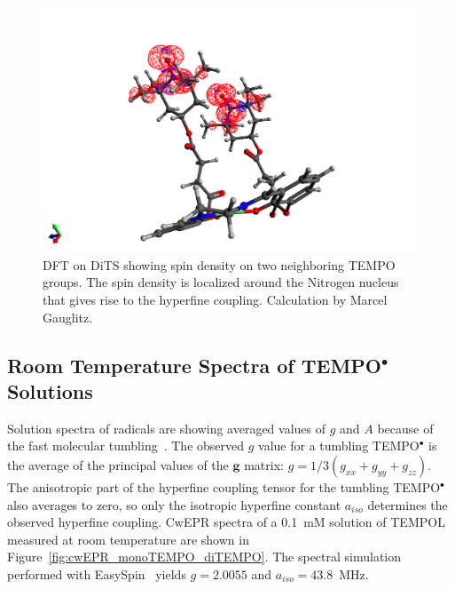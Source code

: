 \begin{figure}[h]
\center
	\includegraphics[width=1\textwidth]{./operando_epr/figures/DITS_DFT.pdf}
	\caption{DFT on DiTS showing spin density on two neighboring TEMPO groups. The spin density is localized around the Nitrogen nucleus that gives rise to the hyperfine coupling. Calculation by Marcel Gauglitz.}
	\label{fig:TEMPO_dft}
\end{figure}



\subsection{Room Temperature Spectra of TEMPO$^{\bullet}$ Solutions}
Solution spectra of radicals are showing averaged values of $g$ and $A$ because of the fast molecular tumbling~\cite{Liu_2008,Carrington_solution_epr}. The observed $g$ value for a tumbling TEMPO$^{\bullet}$ is the average of the principal values of the $\textbf{g}$ matrix: $g = 1/3\left(g_{xx}+g_{yy}+g_{zz}\right)$. The anisotropic part of the hyperfine coupling tensor for the tumbling TEMPO$^{\bullet}$ also averages to zero, so only the isotropic hyperfine constant $a_{iso}$ determines the observed hyperfine coupling. CwEPR spectra of a 0.1~mM solution of TEMPOL measured at room temperature are shown in Figure~\ref{fig:cwEPR_monoTEMPO_diTEMPO}. The spectral simulation performed with EasySpin~\cite{Stoll2006} yields $g=2.0055$ and $a_{iso}=43.8$~MHz.


